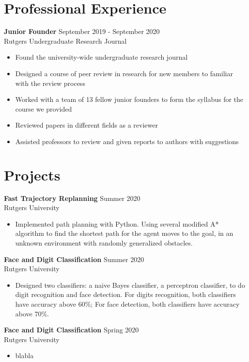 \documentclass{article}
\begin{document}
\section{Professional Experience}
\textbf{Junior Founder}
\hfill{September 2019 - September 2020}\\
Rutgers Undergraduate Research Journal
\begin{itemize}
  \itemsep0em
  \item Found the university-wide undergraduate research journal
  \item Designed a course of peer review in research for new members to familiar with the
review process
  \item  Worked with a team of 13 fellow junior founders to form the syllabus for the course we
provided
  \item Reviewed papers in different fields as a reviewer
  \item Assisted professors to review and given reports to authors with suggestions
\end{itemize}


\section{Projects}
\textbf{Fast Trajectory Replanning}
\hfill{Summer 2020}\\
Rutgers University
\begin{itemize}
  \itemsep0em
  \item Implemented path planning with Python. Using several modified A* algorithm to find the shortest path for the agent moves to the goal, in an unknown environment with randomly generalized obstacles. 
\end{itemize}

\noindent \textbf{Face and Digit Classification}
\hfill{Summer 2020}\\
Rutgers University
\begin{itemize}
  \itemsep0em
  \item Designed two classifiers: a naive Bayes classifier, a perceptron classifier, to do digit recognition and face detection. For digits recognition, both classifiers have accuracy above 60\%; For face detection, both classifiers have accuracy above 70\%.
\end{itemize}

\noindent \textbf{Face and Digit Classification}
\hfill{Spring 2020}\\
Rutgers University
\begin{itemize}
  \itemsep0em
  \item blabla
\end{itemize}
\end{document}
